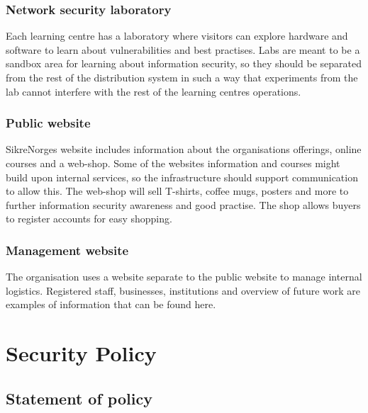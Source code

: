\subsubsection{Network security laboratory}

Each learning centre has a laboratory where visitors can explore hardware and software to learn about vulnerabilities and best practises. Labs are meant to be a sandbox area for learning about information security, so they should be separated from the rest of the distribution system in such a way that experiments from the lab cannot interfere with the rest of the learning centres operations.


\subsubsection{Public website}

SikreNorges website includes information about the organisations offerings, online courses and a web-shop. Some of the websites information and courses might build upon internal services, so the infrastructure should support communication to allow this. The web-shop will sell T-shirts, coffee mugs, posters and more to further information security awareness and good practise. The shop allows buyers to register accounts for easy shopping.

\subsubsection{Management website}

The organisation uses a website separate to the public website to manage internal logistics. Registered staff, businesses, institutions and overview of future work are examples of information that can be found here.


\section{Security Policy}


\subsection{Statement of policy}

